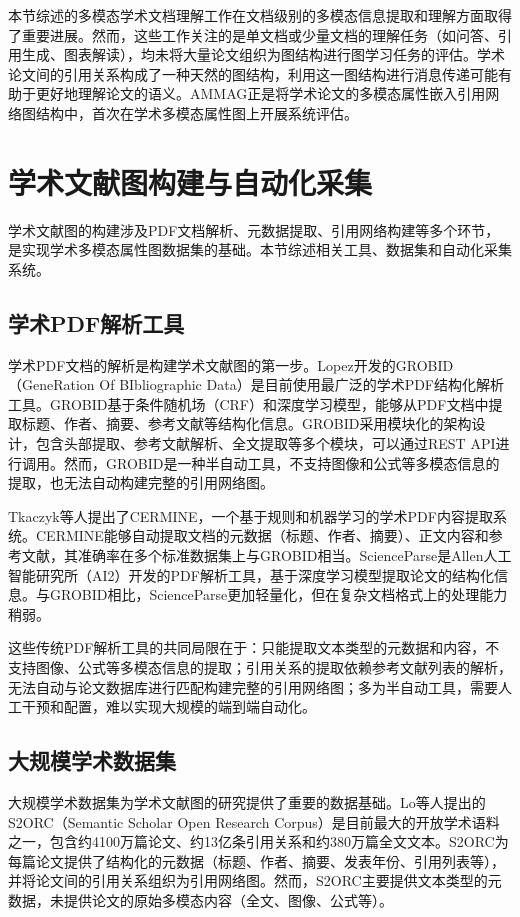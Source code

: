 本节综述的多模态学术文档理解工作在文档级别的多模态信息提取和理解方面取得了重要进展。然而，这些工作关注的是单文档或少量文档的理解任务（如问答、引用生成、图表解读），均未将大量论文组织为图结构进行图学习任务的评估。学术论文间的引用关系构成了一种天然的图结构，利用这一图结构进行消息传递可能有助于更好地理解论文的语义。AMMAG正是将学术论文的多模态属性嵌入引用网络图结构中，首次在学术多模态属性图上开展系统评估。

\section{学术文献图构建与自动化采集}

学术文献图的构建涉及PDF文档解析、元数据提取、引用网络构建等多个环节，是实现学术多模态属性图数据集的基础。本节综述相关工具、数据集和自动化采集系统。

\subsection{学术PDF解析工具}

学术PDF文档的解析是构建学术文献图的第一步。Lopez\cite{lopez2009grobid}开发的GROBID（GeneRation Of BIbliographic Data）是目前使用最广泛的学术PDF结构化解析工具。GROBID基于条件随机场（CRF）和深度学习模型，能够从PDF文档中提取标题、作者、摘要、参考文献等结构化信息。GROBID采用模块化的架构设计，包含头部提取、参考文献解析、全文提取等多个模块，可以通过REST API进行调用。然而，GROBID是一种半自动工具，不支持图像和公式等多模态信息的提取，也无法自动构建完整的引用网络图。

Tkaczyk等人\cite{tkaczyk2015cermine}提出了CERMINE，一个基于规则和机器学习的学术PDF内容提取系统。CERMINE能够自动提取文档的元数据（标题、作者、摘要）、正文内容和参考文献，其准确率在多个标准数据集上与GROBID相当。ScienceParse是Allen人工智能研究所（AI2）开发的PDF解析工具，基于深度学习模型提取论文的结构化信息。与GROBID相比，ScienceParse更加轻量化，但在复杂文档格式上的处理能力稍弱。

这些传统PDF解析工具的共同局限在于：只能提取文本类型的元数据和内容，不支持图像、公式等多模态信息的提取；引用关系的提取依赖参考文献列表的解析，无法自动与论文数据库进行匹配构建完整的引用网络图；多为半自动工具，需要人工干预和配置，难以实现大规模的端到端自动化。

\subsection{大规模学术数据集}

大规模学术数据集为学术文献图的研究提供了重要的数据基础。Lo等人\cite{lo2020s2orc}提出的S2ORC（Semantic Scholar Open Research Corpus）是目前最大的开放学术语料之一，包含约4100万篇论文、约13亿条引用关系和约380万篇全文文本。S2ORC为每篇论文提供了结构化的元数据（标题、作者、摘要、发表年份、引用列表等），并将论文间的引用关系组织为引用网络图。然而，S2ORC主要提供文本类型的元数据，未提供论文的原始多模态内容（全文、图像、公式等）。

